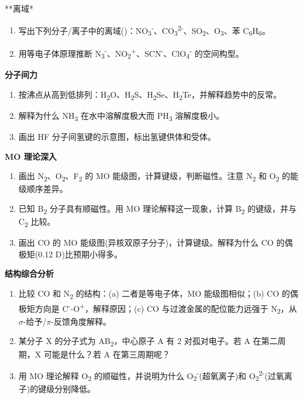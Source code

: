 \documentclass[a4paper,11pt]{ctexart}
\newcommand{\箭}{\ensuremath{\rightarrow}}
\newcommand{\左箭}{\ensuremath{\leftarrow}}
\newcommand{\上箭}{\ensuremath{\uparrow}}
\newcommand{\下箭}{\ensuremath{\downarrow}}
\newcommand{\衡}{\ensuremath{\rightleftharpoons}}
\newcommand{\双箭}{\ensuremath{\leftrightarrow}}
\newcommand{\约等于}{\ensuremath{\approx}}
\newcommand{\小于等于}{\ensuremath{\leq}}
\newcommand{\大于等于}{\ensuremath{\geq}}
\newcommand{\不等于}{\ensuremath{\neq}}
\newcommand{\西格马}{\ensuremath{\sigma}}
\newcommand{\派}{\ensuremath{\pi}}
\begin{document}
**离域*

\begin{enumerate}
\def\labelenumi{\arabic{enumi}.}
\setcounter{enumi}{9}
\item
  写出下列分子/离子中的离域()：NO\textsubscript{3}\textsuperscript{-}、CO\textsubscript{3}\textsuperscript{2-}、SO\textsubscript{2}、O\textsubscript{3}、苯 C\textsubscript{6}H\textsubscript{6}。
\item
  用等电子体原理推断 N\textsubscript{3}\textsuperscript{-}、NO\textsubscript{2}\textsuperscript{+}、SCN\textsuperscript{-}、ClO\textsubscript{4}\textsuperscript{-} 的空间构型。
\end{enumerate}

\textbf{分子间力}

\begin{enumerate}
\def\labelenumi{\arabic{enumi}.}
\setcounter{enumi}{11}
\item
  按沸点从高到低排列：H\textsubscript{2}O、H\textsubscript{2}S、H\textsubscript{2}Se、H\textsubscript{2}Te，并解释趋势中的反常。
\item
  解释为什么 NH\textsubscript{3} 在水中溶解度极大而 PH\textsubscript{3} 溶解度极小。
\item
  画出 HF 分子间氢键的示意图，标出氢键供体和受体。
\end{enumerate}

\textbf{MO 理论深入}

\begin{enumerate}
\def\labelenumi{\arabic{enumi}.}
\setcounter{enumi}{14}
\item
  画出 N\textsubscript{2}、O\textsubscript{2}、F\textsubscript{2} 的 MO 能级图，计算键级，判断磁性。注意 N\textsubscript{2} 和 O\textsubscript{2} 的能级顺序差异。
\item
  已知 B\textsubscript{2} 分子具有顺磁性。用 MO 理论解释这一现象，计算 B\textsubscript{2} 的键级，并与 C\textsubscript{2} 比较。
\item
  画出 CO 的 MO 能级图(异核双原子分子)，计算键级。解释为什么 CO 的偶极矩(0.12 D)比预期小得多。
\end{enumerate}

\textbf{结构综合分析}

\begin{enumerate}
\def\labelenumi{\arabic{enumi}.}
\setcounter{enumi}{17}
\item
  比较 CO 和 N\textsubscript{2} 的结构：(a) 二者是等电子体，MO 能级图相似；(b) CO 的偶极矩方向是 C\textsuperscript{-}-O\textsuperscript{+}，解释原因；(c) CO 与过渡金属的配位能力远强于 N\textsubscript{2}，从 \西格马-给予/\派-反馈角度解释。
\item
  某分子 X 的分子式为 AB\textsubscript{2}，中心原子 A 有 2 对孤对电子。若 A 在第二周期，X 可能是什么？若 A 在第三周期呢？
\item
  用 MO 理论解释 O\textsubscript{2} 的顺磁性，并说明为什么 O\textsubscript{2}\textsuperscript{-}(超氧离子)和 O\textsubscript{2}\textsuperscript{2-}(过氧离子)的键级分别降低。
\end{enumerate}
\end{document}
